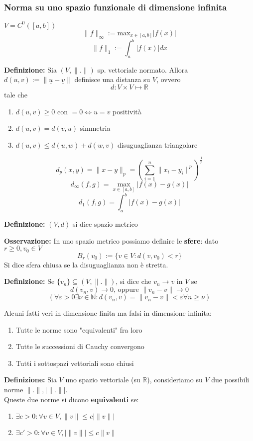 \documentclass[a4paper]{article}
\newcommand{\R}{\mathbb{R}}
\newcommand{\N}{\mathbb{N}}
\begin{document}
\subsubsection{Norma su uno spazio funzionale di dimensione infinita}
$V=C^0([a,b])$
\[\|f\|_\infty:=\text{max}_{x\in[a,b]}|f(x)|\]
\[\|f\|_1:=\int_{a}^{b} |f(x)|dx\]
\begin{tcolorbox}	
\textbf{Definizione:} Sia $(V,\|.\|)$ sp. vettoriale normato. Allora $d(u,v):=\|\underline{u}-\underline{v}\|$ definisce una distanza su $V$, ovvero
\[d:V\times V\mapsto \R\]
tale che
\begin{enumerate}
	\item $d(u,v)\ge 0$ con $=0\iff u=v$ positività
	\item $d(u,v)=d(v,u)$ simmetria
	\item $d(u,v)\le d(u,w)+d(w,v)$ disuguaglianza triangolare
\end{enumerate}
\end{tcolorbox}
\[d_p(x,y)=\|x-y\|_p=(\sum_{i=1}^{n} \|x_i-y_i\|^p)^{\frac{1}{p}}\]
\[d_\infty(f,g)=\max_{x\in[a,b]}|f(x)-g(x)|\]
\[d_1(f,g)=\int_{a}^{b} |f(x)-g(x)|\]
\begin{tcolorbox}
	\textbf{Definizione:} $(V,d)$ si dice spazio metrico
\end{tcolorbox}
\textbf{Osservazione:} In uno spazio metrico possiamo definire le \textbf{sfere}: dato $r\ge 0,v_0\in V$
\[B_r(v_0):=\{v\in V:d(v,v_0)<r\} \]
Si dice sfera chiusa se la disuguaglianza non è stretta.\\
\begin{tcolorbox}	
\textbf{Definizione:} Se $\{v_n\} \subseteq  (V,\|.\|)$, si dice che $v_n\to v$ in $V$ se
\[d(v_n,v)\to 0\text{, oppure }\|v_n-v\|\to 0\]
\[(\forall \varepsilon>0\exists \nu\in\N:d(v_n,v)=\|v_n-v\|<\varepsilon\forall n\ge \nu)\]
\end{tcolorbox}
Alcuni fatti veri in dimensione finita ma falsi in dimensione infinita:
\begin{enumerate}
	\item Tutte le norme sono "equivalenti" fra loro
	\item Tutte le successioni di Cauchy convergono
	\item Tutti i sottospazi vettoriali sono chiusi
\end{enumerate}
\begin{tcolorbox}
\textbf{Definizione:} Sia $V$ uno spazio vettoriale (su $\R$), consideriamo su $V$ due possibili norme $ \|.\|,|\|.\||$.
\\Queste due norme si dicono \textbf{equivalenti} se:
\begin{enumerate}
	\item $\exists c>0:\forall v\in V,\|v\|\le c|\|v\||$
	\item $\exists c'>0:\forall v\in V,|\|v\||\le c\|v\|$
\end{enumerate}
\end{tcolorbox}
\end{document}
